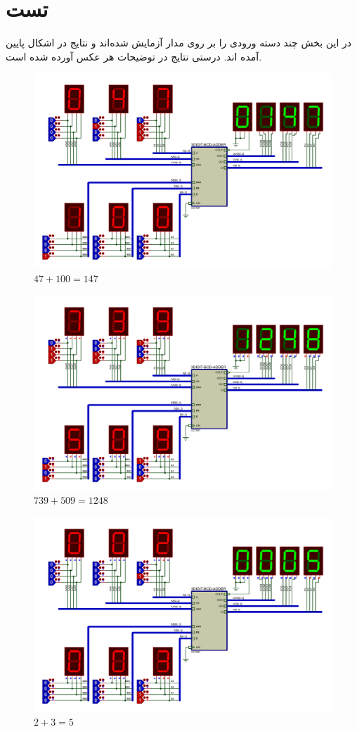 \documentclass{article}
\begin{document}
\section{تست}
در این بخش چند دسته ورودی را بر روی مدار آزمایش شده‌اند و نتایج در اشکال پایین آمده اند. درستی نتایج در توضیحات هر عکس آورده شده است.  

\begin{figure}[H]
	\centering
	\includegraphics[scale=0.4]{./captures/test}
	\caption{$ 47 + 100 = 147 $}
\end{figure}

\begin{figure}[H]
	\centering
	\includegraphics[scale=0.4]{./captures/test2}
	\caption{$ 739 + 509 = 1248 $}
\end{figure}


\begin{figure}[H]
	\centering
	\includegraphics[scale=0.4]{./captures/test3}
	\caption{$ 2 + 3 = 5 $}
\end{figure}
\end{document}
